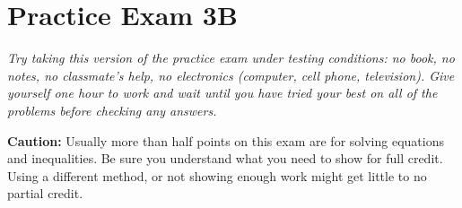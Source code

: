 
\section*{Practice Exam 3B}  

\emph{Try taking this version of the practice exam under testing conditions:  no book, no notes, no classmate's help, no electronics (computer, cell phone, television). Give yourself one hour to work and wait until you have tried your best on all of the problems before checking any answers.} \bigskip

\noindent \textbf{Caution:} Usually more than half points on this exam are for solving equations and inequalities. Be sure you understand what you need to show for full credit.  Using a different method, or not showing enough work might get little to no partial credit. \bigskip

\noindent \hrulefill

